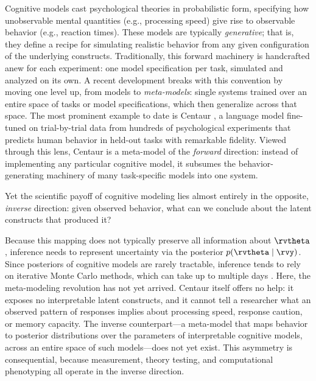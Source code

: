 Cognitive models cast psychological theories in probabilistic form, specifying how unobservable mental quantities (e.g., processing speed) give rise to observable behavior (e.g., reaction times).
These models are typically \textit{generative}; that is, they define a recipe for simulating realistic behavior from any given configuration of the underlying constructs.
Traditionally, this forward machinery is handcrafted anew for each experiment: one model specification per task, simulated and analyzed on its own.
A recent development breaks with this convention by moving one level up, from models to \textit{meta-models}: single systems trained over an entire space of tasks or model specifications, which then generalize across that space.
The most prominent example to date is Centaur \citep{binz2025centaur}, a language model fine-tuned on trial-by-trial data from hundreds of psychological experiments that predicts human behavior in held-out tasks with remarkable fidelity.
Viewed through this lens, Centaur is a meta-model of the \textit{forward} direction: instead of implementing any particular cognitive model, it subsumes the behavior-generating machinery of many task-specific models into one system.

Yet the scientific payoff of cognitive modeling lies almost entirely in the opposite, \textit{inverse} direction: given observed behavior, what can we conclude about the latent constructs that produced it?

Because this mapping does not typically preserve all information about $\rvtheta$, inference needs to represent uncertainty via the posterior $p(\rvtheta \mid \rvy)$. Since posteriors of cognitive models are rarely tractable, inference tends to rely on iterative Monte Carlo methods, which can take up to multiple days \citep[e.g.,][]{stricklandRacingRemember2018, mileticParameterRecovery2017}.
Here, the meta-modeling revolution has not yet arrived. Centaur itself offers no help: it exposes no interpretable latent constructs, and it cannot tell a researcher what an observed pattern of responses implies about processing speed, response caution, or memory capacity.
The inverse counterpart---a meta-model that maps behavior to posterior distributions over the parameters of interpretable cognitive models, across an entire space of such models---does not yet exist.
This asymmetry is consequential, because measurement, theory testing, and computational phenotyping all operate in the inverse direction.

